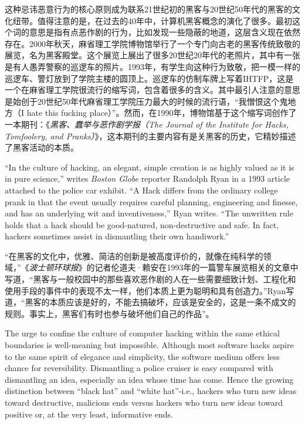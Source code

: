 \ifdefined\chs
这种忌讳恶意行为的核心原则成为联系21世纪初的黑客与20世纪50年代的黑客的文化纽带。值得注意的是，在过去的40年中，计算机黑客概念的演化了很多。最初这个词的意思是指有点恶作剧的行为，比如发现一些隐蔽的地道，这层含义现在依然存在。2000年秋天，麻省理工学院博物馆举行了一个专门向古老的黑客传统致敬的展览，名为黑客殿堂。这个展览上展出了很多20世纪20年代的老照片，其中有一张是有人愚弄警察的巡逻车的照片。1993年，有学生向这种行为致敬，把一模一样的巡逻车、警灯放到了学院主楼的圆顶上。巡逻车的仿制车牌上写着IHTFP，这是一个在麻省理工学院很流行的缩写词，包含着很多的含义。其中最引人注意的意思是始创于20世纪50年代麻省理工学院压力最大的时候的流行语，“我憎恨这个鬼地方（I hate this fucking place）”。然而，在1990年，博物馆基于这个缩写词创作了一本期刊：《\textit{黑客、蠢举与恶作剧学报（The Journal of the Institute for Hacks, Tomfoolery, and Pranks）}》，这本期刊的主要内容有是关黑客的历史，它精妙描述了黑客活动的本质。
\fi

\ifdefined\eng
``In the culture of hacking, an elegant, simple creation is as highly valued as it is in pure science,'' writes \textit{Boston Globe} reporter Randolph Ryan in a 1993 article attached to the police car exhibit. ``A Hack differs from the ordinary college prank in that the event usually requires careful planning, engineering and finesse, and has an underlying wit and inventiveness,'' Ryan writes. ``The unwritten rule holds that a hack should be good-natured, non-destructive and safe. In fact, hackers sometimes assist in dismantling their own handiwork.''
\fi

\ifdefined\chs
“在黑客的文化中，优雅、简洁的创新是被高度评价的，就像在纯科学的领域，”《\textit{波士顿环球报}》的记者伦道夫·赖安在1993年的一篇警车展览相关的文章中写道，“黑客与一般校园中的那些喜欢恶作剧的人在一些需要细致计划、工程化和使用手段的事件中的表现不太一样，他们本质上更为聪明和具有创造力。”Ryan写道，“黑客的本质应该是好的，不能去搞破坏，应该是安全的，这是一条不成文的规则。事实上，黑客们有时也参与破坏他们自己的作品”。
\fi

\ifdefined\eng
The urge to confine the culture of computer hacking within the same ethical boundaries is well-meaning but impossible. Although most software hacks aspire to the same spirit of elegance and simplicity, the software medium offers less chance for reversibility. Dismantling a police cruiser is easy compared with dismantling an idea, especially an idea whose time has come. Hence the growing distinction between ``black hat'' and ``white hat''-i.e., hackers who turn new ideas toward destructive, malicious ends versus hackers who turn new ideas toward positive or, at the very least, informative ends.
\fi

